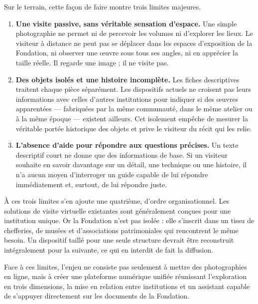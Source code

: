Sur le terrain, cette façon de faire montre trois limites majeures.

\begin{enumerate}
  \item \textbf{Une visite passive, sans véritable sensation d'espace.} Une
        simple photographie ne permet ni de percevoir les volumes ni d'explorer
        les lieux. Le visiteur à distance ne peut pas se déplacer dans les
        espaces d'exposition de la Fondation, ni observer une œuvre sous tous
        ses angles, ni en apprécier la taille réelle. Il regarde une image ; il
        ne visite pas.

  \item \textbf{Des objets isolés et une histoire incomplète.} Les fiches
        descriptives traitent chaque pièce séparément. Les dispositifs actuels
        ne croisent pas leurs informations avec celles d'autres institutions
        pour indiquer si des œuvres apparentées — fabriquées par la même
        communauté, dans le même atelier ou à la même époque — existent
        ailleurs. Cet isolement empêche de mesurer la véritable portée
        historique des objets et prive le visiteur du récit qui les relie.

  \item \textbf{L'absence d'aide pour répondre aux questions précises.} Un texte
        descriptif court ne donne que des informations de base. Si un visiteur
        souhaite en savoir davantage sur un détail, une technique ou une
        histoire, il n'a aucun moyen d'interroger un guide capable de lui
        répondre immédiatement et, surtout, de lui répondre juste.
\end{enumerate}

À ces trois limites s'en ajoute une quatrième, d'ordre organisationnel. Les
solutions de visite virtuelle existantes sont généralement conçues pour une
institution unique. Or la Fondation n'est pas isolée : elle s'inscrit dans un
tissu de chefferies, de musées et d'associations patrimoniales qui rencontrent
le même besoin. Un dispositif taillé pour une seule structure devrait être
reconstruit intégralement pour la suivante, ce qui en interdit de fait la
diffusion.

Face à ces limites, l'enjeu ne consiste pas seulement à mettre des photographies
en ligne, mais à créer une plateforme numérique unifiée réunissant l'exploration
en trois dimensions, la mise en relation entre institutions et un assistant
capable de s'appuyer directement sur les documents de la Fondation.

